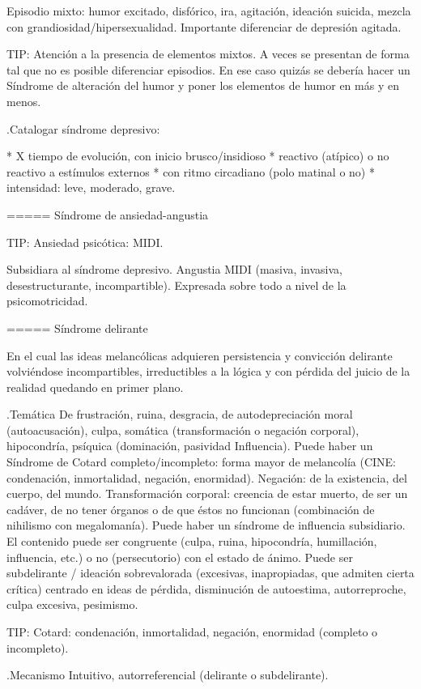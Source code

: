 Episodio mixto: humor excitado, disfórico, ira, agitación, ideación suicida, mezcla con grandiosidad/hipersexualidad. Importante diferenciar de depresión agitada.

TIP: Atención a la presencia de elementos mixtos. A veces se presentan de forma tal que no es posible diferenciar episodios. En ese caso quizás se debería hacer un Síndrome de alteración del humor y poner los elementos de humor en más y en menos.

.Catalogar síndrome depresivo:

* X tiempo de evolución, con inicio brusco/insidioso
* reactivo (atípico) o no reactivo a estímulos externos
* con ritmo circadiano (polo matinal o no)
* intensidad: leve, moderado, grave.


===== Síndrome de ansiedad-angustia

TIP: Ansiedad psicótica: MIDI.

Subsidiara al síndrome depresivo. Angustia MIDI (masiva, invasiva, desestructurante, incompartible). Expresada sobre todo a nivel de la psicomotricidad.

===== Síndrome delirante

En el cual las ideas melancólicas adquieren persistencia y convicción delirante volviéndose incompartibles, irreductibles a la lógica y con pérdida del juicio de la realidad quedando en primer plano.

.Temática
De frustración, ruina, desgracia, de autodepreciación moral (autoacusación), culpa, somática (transformación o negación corporal), hipocondría, psíquica (dominación, pasividad Influencia). Puede haber un Síndrome de Cotard completo/incompleto: forma mayor de melancolía (CINE: condenación, inmortalidad, negación, enormidad). Negación: de la existencia, del cuerpo, del mundo. Transformación corporal: creencia de estar muerto, de ser un cadáver, de no tener órganos o de que éstos no funcionan (combinación de nihilismo con megalomanía).
Puede haber un síndrome de influencia subsidiario.
El contenido puede ser congruente (culpa, ruina, hipocondría, humillación, influencia, etc.) o no (persecutorio) con el estado de ánimo.
Puede ser subdelirante / ideación sobrevalorada (excesivas, inapropiadas, que admiten cierta crítica) centrado en ideas de pérdida, disminución de autoestima, autorreproche, culpa excesiva, pesimismo.

TIP: Cotard: condenación, inmortalidad, negación, enormidad (completo o incompleto).

.Mecanismo
Intuitivo, autorreferencial (delirante o subdelirante).

